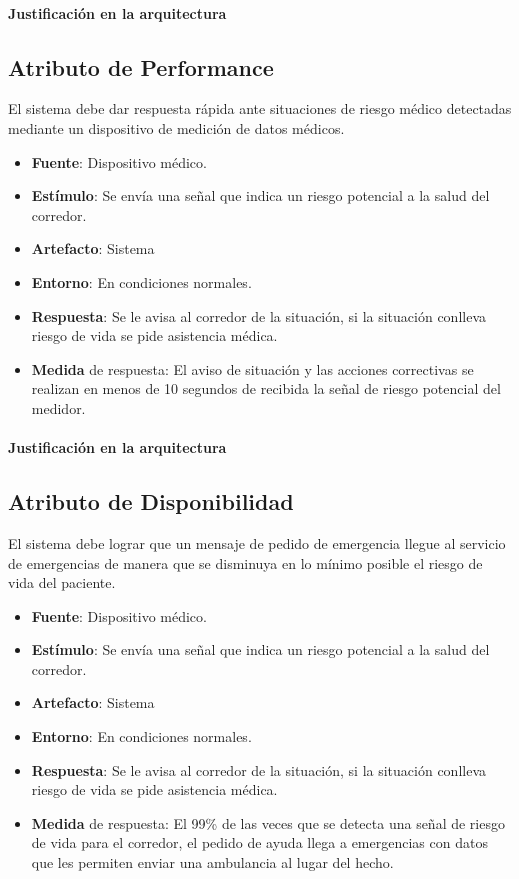 \paragraph{Justificación en la arquitectura}


\subsection{Atributo de Performance}
El sistema debe dar respuesta rápida ante situaciones de riesgo médico detectadas mediante un dispositivo de medición de datos médicos.

\begin{itemize}
  \item \textbf{Fuente}: Dispositivo médico.
  \item \textbf{Estímulo}: Se envía una señal que indica un riesgo potencial a la salud del corredor.
  \item \textbf{Artefacto}: Sistema
  \item \textbf{Entorno}: En condiciones normales.
  \item \textbf{Respuesta}: Se le avisa al corredor de la situación, si la situación conlleva riesgo de vida se pide asistencia médica.
  \item \textbf{Medida} de respuesta: El aviso de situación y las acciones correctivas se realizan en menos de 10 segundos de recibida la señal de riesgo potencial del medidor.
\end{itemize}

\paragraph{Justificación en la arquitectura}


\subsection{Atributo de Disponibilidad}
El sistema debe lograr que un mensaje de pedido de emergencia llegue al servicio de emergencias de manera que se disminuya en lo mínimo posible el riesgo de vida del paciente.

\begin{itemize}
  \item \textbf{Fuente}: Dispositivo médico.
  \item \textbf{Estímulo}: Se envía una señal que indica un riesgo potencial a la salud del corredor.
  \item \textbf{Artefacto}: Sistema
  \item \textbf{Entorno}: En condiciones normales.
  \item \textbf{Respuesta}: Se le avisa al corredor de la situación, si la situación conlleva riesgo de vida se pide asistencia médica.
  \item \textbf{Medida} de respuesta: El 99\% de las veces que se detecta una señal de riesgo de vida para el corredor, el pedido de ayuda llega a emergencias con datos que les permiten enviar una ambulancia al lugar del hecho.
\end{itemize}

